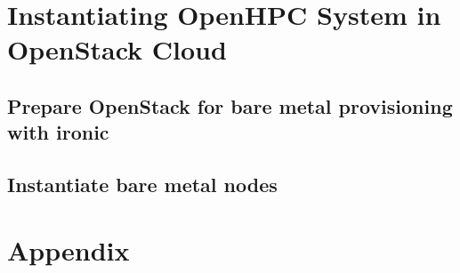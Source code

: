 \documentclass[letterpaper]{article}
\begin{document}





\vspace*{-0.15cm}
\vspace*{-0.50cm}

\clearpage
\section{Instantiating OpenHPC System in OpenStack Cloud}

	
\clearpage
\subsection{Prepare OpenStack for bare metal provisioning with ironic} \label{sec:o-s_prep-ironic}


\vspace*{-0.15cm}
\subsection{Instantiate bare metal nodes} \label{sec:instantiate-bare-metal}


\section{Appendix}

	

\end{document}
